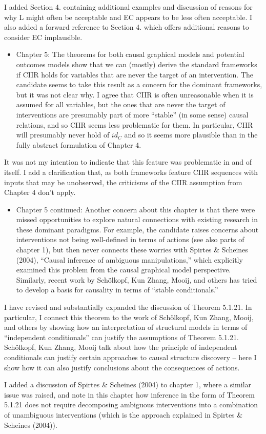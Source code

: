 \documentclass[12pt, a4paper]{article}
\begin{document}
I added Section 4. containing additional examples and discussion of reasons for why L might often be acceptable and EC appears to be less often acceptable. I also added a forward reference to Section 4. which offers additional reasons to consider EC implausible.

\begin{itemize}
    \item Chapter 5: The theorems for both causal graphical models and potential outcomes models show that we can (mostly) derive the standard frameworks if CIIR holds for variables that are never the target of an intervention. The candidate seems to take this result as a concern for the dominant frameworks, but it was not clear why. I agree that CIIR is often unreasonable when it is assumed for all variables, but the ones that are never the target of interventions are presumably part of more “stable” (in some sense) causal relations, and so CIIR seems less problematic for them. In particular, CIIR will presumably never hold of $id_C$ and so it seems more plausible than in the fully abstract formulation of Chapter 4.
\end{itemize}


It was not my intention to indicate that this feature was problematic in and of itself. I add a clarification that, as both frameworks feature CIIR sequences with inputs that may be unobserved, the criticisms of the CIIR assumption from Chapter 4 don't apply.

\begin{itemize}
    \item Chapter 5 continued: Another concern about this chapter is that there were missed opportunities to explore natural connections with existing research in these dominant paradigms. For example, the candidate raises concerns about interventions not being well-defined in terms of actions (see also parts of chapter 1), but then never connects these worries with Spirtes \& Scheines (2004), “Causal inference of ambiguous manipulations,” which explicitly examined this problem from the causal graphical model perspective. Similarly, recent work by Schölkopf, Kun Zhang, Mooij, and others has tried to develop a basis for causality in terms of “stable conditionals.”
\end{itemize}

I have revised and substantially expanded the discussion of Theorem 5.1.21. In particular, I connect this theorem to the work of Schölkopf, Kun Zhang, Mooij, and others by showing how an interpretation of structural models in terms of ``independent conditionals'' can justify the assumptions of Theorem 5.1.21. Schölkopf, Kun Zhang, Mooij talk about how the principle of independent conditionals can justify certain approaches to causal structure discovery -- here I show how it can also justify conclusions about the consequences of actions.

I added a discussion of Spirtes \& Scheines (2004) to chapter 1, where a similar issue was raised, and note in this chapter how inference in the form of Theorem 5.1.21 does not require decomposing ambiguous interventions into a combination of unambiguous interventions (which is the approach explained in Spirtes \& Scheines (2004)).
\end{document}
